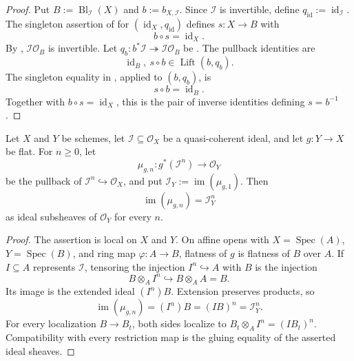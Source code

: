 \begin{proof}
  Put $B:=\operatorname{Bl}_{\mathcal I}(X)$ and $b:=b_{X,\mathcal I}$.
  Since $\mathcal I$ is invertible, define
  $q_{\operatorname{id}}:=\operatorname{id}_{\mathcal I}$.  The singleton
  assertion of  for
  $(\operatorname{id}_X,q_{\operatorname{id}})$ defines
  $s\colon X\to B$ with
  \[
    b\circ s=\operatorname{id}_X.
  \]
  By ,
  $\mathcal I\mathcal O_B$ is invertible.  Let
  $q_b\colon b^*\mathcal I\twoheadrightarrow\mathcal I\mathcal O_B$ be
  .  The pullback identities are
  \[
    \operatorname{id}_B,\ s\circ b\in\operatorname{Lift}(b,q_b).
  \]
  The singleton equality in
  , applied to $(b,q_b)$, is
  \[
    s\circ b=\operatorname{id}_B.
  \]
  Together with $b\circ s=\operatorname{id}_X$, this is the pair of inverse
  identities defining $s=b^{-1}$.
\end{proof}

\begin{lemma}
  \label{lemma:nagata-flat-pullback-ideal-pow}
  \lean{}

  Let $X$ and $Y$ be schemes, let
  $\mathcal I\subseteq\mathcal O_X$ be a quasi-coherent ideal, and let
  $g\colon Y\to X$ be flat.  For $n\ge0$, let
  \[
    \mu_{g,n}\colon g^*(\mathcal I^n)\longrightarrow\mathcal O_Y
  \]
  be the pullback of $\mathcal I^n\hookrightarrow\mathcal O_X$, and put
  $\mathcal I_Y:=\operatorname{im}(\mu_{g,1})$.  Then
  \[
    \operatorname{im}(\mu_{g,n})=\mathcal I_Y^n
  \]
  as ideal subsheaves of $\mathcal O_Y$ for every $n$.
\end{lemma}

\begin{proof}
  The assertion is local on $X$ and $Y$.  On affine opens with
  $X=\operatorname{Spec}(A)$, $Y=\operatorname{Spec}(B)$, and ring map
  $\varphi\colon A\to B$, flatness of $g$ is flatness of $B$ over $A$.
  If $I\subseteq A$ represents $\mathcal I$, tensoring the injection
  $I^n\hookrightarrow A$ with $B$ is the injection
  \[
    B\otimes_AI^n\hookrightarrow B\otimes_AA=B.
  \]
  Its image is the extended ideal $(I^n)B$.  Extension preserves products, so
  \[
    \operatorname{im}(\mu_{g,n})
      =(I^n)B=(IB)^n=\mathcal I_Y^n.
  \]
  For every localization $B\to B_t$, both sides localize to
  $B_t\otimes_AI^n=(IB_t)^n$.  Compatibility with every restriction map is
  the gluing equality of the asserted ideal sheaves.
\end{proof}

